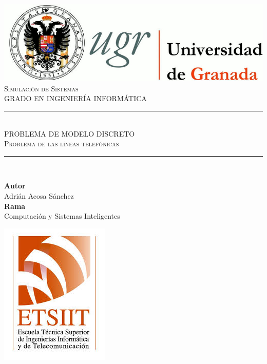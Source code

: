 \documentclass[11pt,a4paper]{report}
\newcommand{\asignatura}{Simulación de Sistemas}
\newcommand{\autor}{Adrián Acosa Sánchez}
\newcommand{\titulo}{PROBLEMA DE MODELO DISCRETO}
\newcommand{\subtitulo}{Problema de las líneas telefónicas}
\newcommand{\rama}{Computación y Sistemas Inteligentes}
\begin{document}

\begin{titlepage}

\begin{minipage}{\textwidth}

\centering

\includegraphics[scale=0.3]{img/logo_ugr.jpg}\\[1cm]

\textsc{\Large \asignatura{}\\[0.2cm]}
\textsc{GRADO EN INGENIERÍA INFORMÁTICA}\\[1cm]

\noindent\rule[-1ex]{\textwidth}{1pt}\\[1.5ex]
\textsc{{\Huge \titulo\\[0.5ex]}}
\textsc{{\Large \subtitulo\\}}
\noindent\rule[-1ex]{\textwidth}{2pt}\\[3.5ex]

\end{minipage}

\vspace{0.7cm}

\begin{minipage}{\textwidth}

\centering

\textbf{Autor}\\ {\autor{}}\\[2.5ex]
\textbf{Rama}\\ {\rama}\\[2.5ex]
\vspace{0.3cm}

\includegraphics[scale=0.3]{img/etsiit.jpeg}


\end{minipage}
\end{titlepage}
\end{document}
